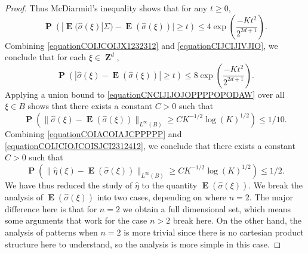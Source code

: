 \documentclass[12pt,reqno]{article}
\numberwithin{equation}{section}
\DeclareMathOperator{\ZZ}{\mathbf{Z}}
\numberwithin{theorem}{section}
\DeclareMathOperator{\EE}{\mathbf{E}}
\DeclareMathOperator{\PP}{\mathbf{P}}
\begin{document}
\begin{proof}
    Thus McDiarmid's inequality shows that for any $t \geq 0$,
    \begin{equation} \label{equationCIJCIJIVJIO}
        \PP \left( |\EE(\widehat{\sigma}(\xi)|\Sigma) - \EE(\widehat{\sigma}(\xi))| \geq t \right) \leq 4 \exp \left( \frac{-K t^2}{2^{2d+1}} \right).
    \end{equation}
    Combining \eqref{equationCOIJCOIJX1232312} and \eqref{equationCIJCIJIVJIO}, we conclude that for each $\xi \in \ZZ^d$,
    \begin{equation} \label{equationCNCIJIJOJOPPPPOPODAW}
        \PP \left( | \widehat{\sigma}(\xi) - \EE(\widehat{\sigma}(\xi)) | \geq t  \right) \leq 8 \exp \left( \frac{-K t^2}{2^{2d + 1}} \right).
    \end{equation}
    Applying a union bound to \eqref{equationCNCIJIJOJOPPPPOPODAW} over all $\xi \in B$ shows that there exists a constant $C > 0$ such that
    \begin{equation} \label{equationCOIJCIOJCOISJCI2312412}
        \PP \left( \| \widehat{\sigma}(\xi) - \EE(\widehat{\sigma}(\xi)) \|_{L^\infty(B)} \geq C K^{-1/2} \log(K)^{1/2} \right) \leq 1/10.
    \end{equation}
    Combining \eqref{equationCOIACOIAJCPPPPP} and \eqref{equationCOIJCIOJCOISJCI2312412}, we conclude that there exists a constant $C > 0$ such that
    \begin{equation} \label{equationOCIJCIOCJIO}
        \PP \left( \| \widehat{\eta}(\xi) - \EE(\widehat{\sigma}(\xi)) \|_{L^\infty(B)} \geq C K^{-1/2} \log(K)^{1/2} \right) \leq 1/2.
    \end{equation}
    We have thus reduced the study of $\widehat{\eta}$ to the quantity $\EE(\widehat{\sigma}(\xi))$. We break the analysis of $\EE(\widehat{\sigma}(\xi))$ into two cases, depending on where $n = 2$. The major difference here is that for $n = 2$ we obtain a full dimensional set, which means some arguments that work for the case $n > 2$ break here. On the other hand, the analysis of patterns when $n = 2$ is more trivial since there is no cartesian product structure here to understand, so the analysis is more simple in this case.

\end{proof}
\end{document}
